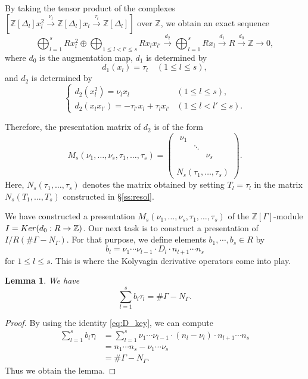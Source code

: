 \documentclass[11pt]{article}
\newtheorem{lemm}[theo]{Lemma}
\theoremstyle{definition}
\numberwithin{equation}{section}
\newcommand{\Z}{\mathbb{Z}}
\newcommand{\Ker}{{\rm Ker}}
\begin{document}
By taking the tensor product of the complexes $[\Z[\Delta_l] x_l^2 \overset{\nu_l}{\to} \Z[\Delta_l] x_l \overset{\tau_l}{\to} \Z[\Delta_l]]$ over $\Z$, we obtain an exact sequence
\[
\bigoplus_{l=1}^s R x_l^2 \oplus \bigoplus_{1 \leq l < l' \leq s} R x_l x_{l'} 
\overset{d_2}{\to} \bigoplus_{l=1}^s R x_l 
\overset{d_1}{\to} R
\overset{d_0}{\to} \Z \to 0,
\]
where $d_0$ is the augmentation map, $d_1$ is determined by
\[
d_1(x_l) = \tau_l  \quad (1 \leq l \leq s),
\]
and $d_2$ is determined by
\[
\begin{cases}
d_2(x_l^2) = \nu_l x_l & (1 \leq l \leq s),\\
d_2(x_l x_{l'}) = -\tau_{l'} x_l + \tau_l x_{l'} &(1 \leq l < l' \leq s).
\end{cases}
\]

Therefore, the presentation matrix of $d_2$ is of the form
\[
M_s(\nu_1,\dots, \nu_s, \tau_1, \dots, \tau_s) = 
\begin{pmatrix}
\begin{matrix}
\nu_1 & & \\
& \ddots & \\
& & \nu_s \\
\end{matrix}\\
 N_s(\tau_1, \dots, \tau_s) 
\end{pmatrix}.
\]
Here, $N_s(\tau_1, \dots, \tau_s)$ denotes the matrix obtained by setting $T_l = \tau_l$ in the matrix $N_s(T_1, \dots, T_s)$ constructed in \S\ref{ss:resol}.

We have constructed a presentation $M_s(\nu_1,\dots, \nu_s, \tau_1, \dots, \tau_s)$ of the $\Z[\Gamma]$-module $I = \Ker(d_0: R \to \Z)$.
Our next task is to construct a presentation of $I/R(\# \Gamma - N_{\Gamma})$.
For that purpose, we define elements $b_1, \cdots, b_s \in R$ by
\[
b_l = \nu_1 \cdots \nu_{l-1} \cdot D_l \cdot n_{l+1} \cdots n_s
\]
for $1 \leq l \leq s$.
This is where the Kolyvagin derivative operators come into play.

\begin{lemm}\label{lem:sum_bt}
We have
\[
\sum_{l=1}^s b_l \tau_l = \# \Gamma - N_{\Gamma}.
\]
\end{lemm}

\begin{proof}
By using the identity \eqref{eq:D_key}, we can compute
\begin{align}
\sum_{l=1}^s b_l \tau_l 
& = \sum_{l=1}^s \nu_1 \cdots \nu_{l-1} \cdot (n_l - \nu_l) \cdot n_{l+1} \cdots n_s\\
& = n_1 \cdots n_s - \nu_1 \cdots \nu_s\\
& = \# \Gamma - N_{\Gamma}.
\end{align}
Thus we obtain the lemma.
\end{proof}
\end{document}
